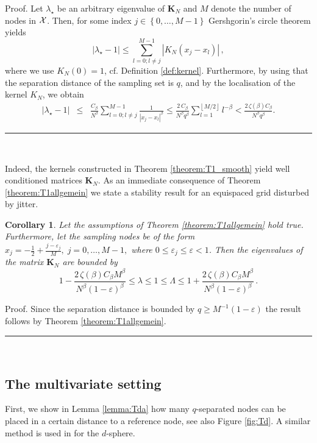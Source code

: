 \documentclass[11pt,a4paper,bibtotoc]{scrartcl}
\newcommand{\zb}[1]{\ensuremath{\boldsymbol{#1}}}
\renewcommand{\Box}{\hspace*{0ex} \hfill \rule{1.5ex}{1.5ex} \\ \goodbreak}
\newcommand{\Boxgl}{\par\vspace{-5ex} \hspace*{0ex} \hfill
  \rule{1.5ex}{1.5ex} \\ \goodbreak\goodbreak}
\newtheorem{corollary}[theorem]{Corollary}
\newenvironment{Corollary}{\goodbreak \begin{corollary}\rm}{\end{corollary}}
\numberwithin{equation}{section}
\numberwithin{table}{section}
\numberwithin{figure}{section}
\begin{document}
Proof.
Let $\lambda_{\star}$ be an arbitrary eigenvalue of $\zb K_N$ and $M$ denote
the number of nodes in $\cal X$.
Then, for some index $j\in\left\{0,\hdots,M-1\right\}$ Gershgorin's circle theorem
yields
\begin{equation*}
  \left|\lambda_{\star}-1\right|
  \le \sum\limits_{l=0; l\ne j}^{M-1}
  \left|K_N\left(x_j-x_l\right)\right| \, ,
\end{equation*}
where we use $K_N\left(0\right)=1$, cf. Definition \ref{def:kernel}.
Furthermore, by using that the separation distance of the sampling set is $q$,
and by the localisation of the kernel $K_N$, we obtain
\begin{eqnarray*}
  \left|\lambda_{\star}-1\right|
  &\le & \frac{C_{\beta}}{N^{\beta} }\sum\limits_{l=0; l\ne j}^{M-1}
  \frac{1}{\left| x_j-x_l\right|^\beta}
  \le  \frac{2 \, C_{\beta}}{N^{\beta} q^{\beta}}
  \sum\limits_{l=1}^{\left\lfloor M/2\right\rfloor} l^{-\beta}
    <   \frac{2\,\zeta(\beta) C_{\beta}}{N^{\beta} q^{\beta}}.
\end{eqnarray*}
\Boxgl

Indeed, the kernels constructed in Theorem \ref{theorem:T1_smooth} yield well
conditioned matrices $\zb K_N$.
As an immediate consequence of Theorem \ref{theorem:T1allgemein} we state a
stability result for an equispaced grid disturbed by jitter.
\begin{Corollary}\label{cor:jitter}
  Let the assumptions of Theorem \ref{theorem:T1allgemein} hold true.
  Furthermore, let the sampling nodes be of the form
  $x_j=-\frac{1}{2}+\frac{j-\varepsilon_j}{M},\; j=0,\hdots,M-1,$ where
  $0\le\varepsilon_j \le \varepsilon < 1$.
  Then the eigenvalues of the matrix $\zb K_N$ are bounded by
  \begin{equation*}
    1-\frac{2\, \zeta\left(\beta\right) C_{\beta} M^{\beta}}{N^{\beta} \left(1-
        \varepsilon \right)^{\beta}} \le \lambda \le 1 \le \Lambda \le
    1+\frac{2\, \zeta\left(\beta\right) C_{\beta} M^{\beta}}{N^{\beta} \left(1-
        \varepsilon \right)^{\beta}}\,.
  \end{equation*}
\end{Corollary}

Proof. Since the separation distance is bounded by $q\ge M^{-1}
(1-\varepsilon)$ the result follows by Theorem \ref{theorem:T1allgemein}. \Box

\subsection*{The multivariate setting}
First, we show in Lemma \ref{lemma:Tda} how many $q$-separated nodes can be
placed in a certain distance to a reference node, see also Figure
\ref{fig:Td}.
A similar method is  used in \cite{NaSiWa98} for the $d$-sphere.
\end{document}
